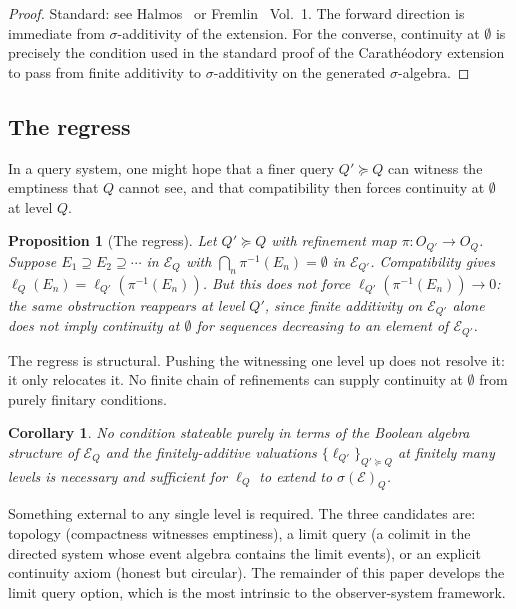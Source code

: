 \documentclass[12pt]{article}
\newtheorem{proposition}[theorem]{Proposition}
\newtheorem{corollary}[theorem]{Corollary}
\theoremstyle{definition}
\theoremstyle{remark}
\newcommand{\E}{\mathcal{E}}
\newcommand{\sigE}{\sigma(\mathcal{E})}
\begin{document}
\begin{proof}
Standard: see Halmos~\cite{Halmos1950} or Fremlin~\cite{Fremlin2003} Vol.~1.
The forward direction is immediate from $\sigma$-additivity of the extension.
For the converse, continuity at $\emptyset$ is precisely the condition used in the
standard proof of the Carath\'{e}odory extension to pass from finite additivity to
$\sigma$-additivity on the generated $\sigma$-algebra.
\end{proof}

\subsection{The regress}

In a query system, one might hope that a finer query $Q' \succeq Q$ can witness
the emptiness that $Q$ cannot see, and that compatibility then forces continuity at
$\emptyset$ at level $Q$.

\begin{proposition}[The regress]
\label{prop:regress}
Let $Q' \succeq Q$ with refinement map $\pi : O_{Q'} \to O_Q$.  Suppose
$E_1 \supseteq E_2 \supseteq \cdots$ in $\E_Q$ with $\bigcap_n \pi^{-1}(E_n) =
\emptyset$ in $\E_{Q'}$.  Compatibility gives $\ell_Q(E_n) = \ell_{Q'}(\pi^{-1}(E_n))$.
But this does not force $\ell_{Q'}(\pi^{-1}(E_n)) \to 0$: the same obstruction
reappears at level $Q'$, since finite additivity on $\E_{Q'}$ alone does not imply
continuity at $\emptyset$ for sequences decreasing to an element of $\E_{Q'}$.
\end{proposition}

\noindent The regress is structural.  Pushing the witnessing one level up does not
resolve it: it only relocates it.  No finite chain of refinements can supply continuity
at $\emptyset$ from purely finitary conditions.

\begin{corollary}
\label{cor:no-finitary}
No condition stateable purely in terms of the Boolean algebra structure of $\E_Q$ and
the finitely-additive valuations $\{\ell_{Q'}\}_{Q' \succeq Q}$ at finitely many
levels is necessary and sufficient for $\ell_Q$ to extend to $\sigE_Q$.
\end{corollary}

\noindent Something external to any single level is required.  The three candidates
are: topology (compactness witnesses emptiness), a limit query (a colimit in the
directed system whose event algebra contains the limit events), or an explicit
continuity axiom (honest but circular).  The remainder of this paper develops the
limit query option, which is the most intrinsic to the observer-system framework.
\end{document}
